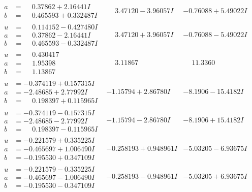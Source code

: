 \documentclass[1p]{elsarticle_modified}
\theoremstyle{definition}
\begin{document}
$$\begin{array}{c|c|c}
\begin{aligned}
a &= \phantom{-}0.37862 + 2.16441 I \\
b &= \phantom{-}0.465593 + 0.332487 I\end{aligned}
 & \phantom{-}3.47120 - 3.96057 I & -0.76088 + 5.49022 I \\ \hline\begin{aligned}
u &= \phantom{-}0.114152 - 0.427480 I \\
a &= \phantom{-}0.37862 - 2.16441 I \\
b &= \phantom{-}0.465593 - 0.332487 I\end{aligned}
 & \phantom{-}3.47120 + 3.96057 I & -0.76088 - 5.49022 I \\ \hline\begin{aligned}
u &= \phantom{-}0.430417\phantom{ +0.000000I} \\
a &= \phantom{-}1.95398\phantom{ +0.000000I} \\
b &= \phantom{-}1.13867\phantom{ +0.000000I}\end{aligned}
 & \phantom{-}3.11867\phantom{ +0.000000I} & \phantom{-}11.3360\phantom{ +0.000000I} \\ \hline\begin{aligned}
u &= -0.374119 + 0.157315 I \\
a &= -2.48685 + 2.77992 I \\
b &= \phantom{-}0.198397 + 0.115965 I\end{aligned}
 & -1.15794 + 2.86780 I & -8.1906 - 15.4182 I \\ \hline\begin{aligned}
u &= -0.374119 - 0.157315 I \\
a &= -2.48685 - 2.77992 I \\
b &= \phantom{-}0.198397 - 0.115965 I\end{aligned}
 & -1.15794 - 2.86780 I & -8.1906 + 15.4182 I \\ \hline\begin{aligned}
u &= -0.221579 + 0.335225 I \\
a &= -0.465697 + 1.006490 I \\
b &= -0.195530 + 0.347109 I\end{aligned}
 & -0.258193 + 0.948961 I & -5.03205 - 6.93675 I \\ \hline\begin{aligned}
u &= -0.221579 - 0.335225 I \\
a &= -0.465697 - 1.006490 I \\
b &= -0.195530 - 0.347109 I\end{aligned}
 & -0.258193 - 0.948961 I & -5.03205 + 6.93675 I \\ \hline\begin{aligned}

\end{aligned}
\end{array}$$
\end{document}
